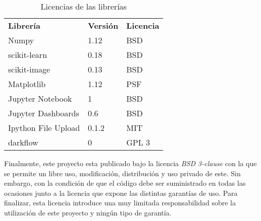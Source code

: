   \begin{table}
  \begin{center}
   \begin{tabular}{p{3.5cm} p{1.5cm} p{2.5cm}}
    \toprule
    \textbf{Librería} & \textbf{Versión} & \textbf{Licencia} \\
    \otoprule
    Numpy & 1.12 & BSD \\
    scikit-learn & 0.18 & BSD \\
    scikit-image & 0.13 & BSD \\
    Matplotlib & 1.12 & PSF \\
    Jupyter Notebook & 1 & BSD \\
    Jupyter Dashboards & 0.6 & BSD \\
	Ipython File Upload & 0.1.2 & MIT \\
	darkflow & 0 & GPL 3 \\
    \bottomrule
   \end{tabular}
   \caption{Licencias de las librerías}
   \label{tabla:licencias}
  \end{center}
 \end{table}
 
 Finalmente, este proyecto esta publicado bajo la licencia \textit{BSD 3-clause} con la que se permite un libre uso, modificación, distribución y uso privado de este. Sin embargo, con la condición de que el código debe ser suministrado en todas las ocasiones junto a la licencia que expone las distintas garantías de uso. Para finalizar, esta licencia introduce una muy limitada responsabilidad sobre la utilización de este proyecto y ningún tipo de garantía.